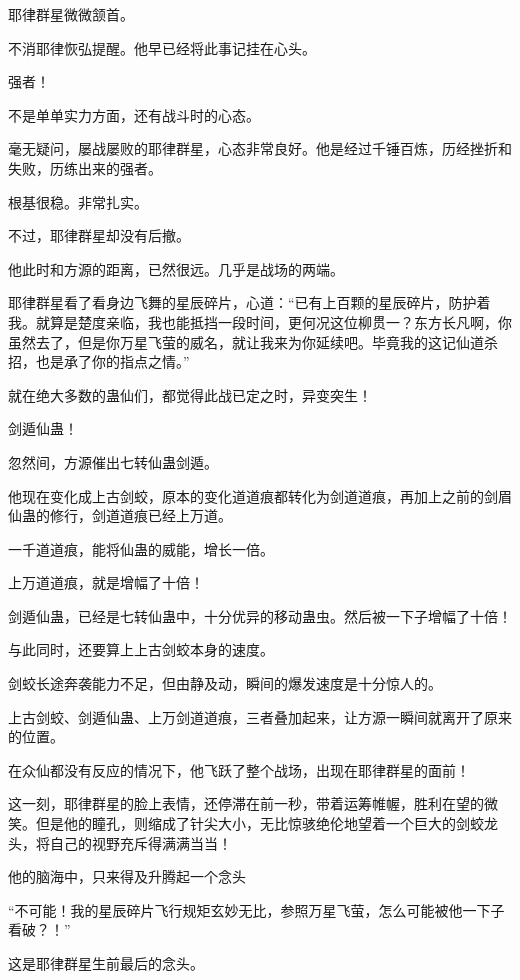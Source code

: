 \begin{this_body}
耶律群星微微颔首。

不消耶律恢弘提醒。他早已经将此事记挂在心头。

强者！

不是单单实力方面，还有战斗时的心态。

毫无疑问，屡战屡败的耶律群星，心态非常良好。他是经过千锤百炼，历经挫折和失败，历练出来的强者。

根基很稳。非常扎实。

不过，耶律群星却没有后撤。

他此时和方源的距离，已然很远。几乎是战场的两端。

耶律群星看了看身边飞舞的星辰碎片，心道：“已有上百颗的星辰碎片，防护着我。就算是楚度亲临，我也能抵挡一段时间，更何况这位柳贯一？东方长凡啊，你虽然去了，但是你万星飞萤的威名，就让我来为你延续吧。毕竟我的这记仙道杀招，也是承了你的指点之情。”

就在绝大多数的蛊仙们，都觉得此战已定之时，异变突生！

剑遁仙蛊！

忽然间，方源催出七转仙蛊剑遁。

他现在变化成上古剑蛟，原本的变化道道痕都转化为剑道道痕，再加上之前的剑眉仙蛊的修行，剑道道痕已经上万道。

一千道道痕，能将仙蛊的威能，增长一倍。

上万道道痕，就是增幅了十倍！

剑遁仙蛊，已经是七转仙蛊中，十分优异的移动蛊虫。然后被一下子增幅了十倍！

与此同时，还要算上上古剑蛟本身的速度。

剑蛟长途奔袭能力不足，但由静及动，瞬间的爆发速度是十分惊人的。

上古剑蛟、剑遁仙蛊、上万剑道道痕，三者叠加起来，让方源一瞬间就离开了原来的位置。

在众仙都没有反应的情况下，他飞跃了整个战场，出现在耶律群星的面前！

这一刻，耶律群星的脸上表情，还停滞在前一秒，带着运筹帷幄，胜利在望的微笑。但是他的瞳孔，则缩成了针尖大小，无比惊骇绝伦地望着一个巨大的剑蛟龙头，将自己的视野充斥得满满当当！

他的脑海中，只来得及升腾起一个念头

“不可能！我的星辰碎片飞行规矩玄妙无比，参照万星飞萤，怎么可能被他一下子看破？！”

这是耶律群星生前最后的念头。

\end{this_body}

